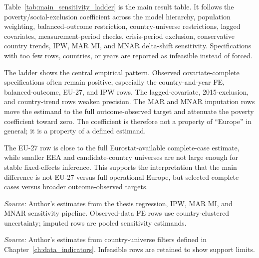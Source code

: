 Table~\ref{tab:main_sensitivity_ladder} is the main result table. It follows the poverty/social-exclusion coefficient across the model hierarchy, population weighting, balanced-outcome restriction, country-universe restrictions, lagged covariates, measurement-period checks, crisis-period exclusion, conservative country trends, IPW, MAR MI, and MNAR delta-shift sensitivity. Specifications with too few rows, countries, or years are reported as infeasible instead of forced.

The ladder shows the central empirical pattern. Observed covariate-complete specifications often remain positive, especially the country-and-year FE, balanced-outcome, EU-27, and IPW rows. The lagged-covariate, 2015-exclusion, and country-trend rows weaken precision. The MAR and MNAR imputation rows move the estimand to the full outcome-observed target and attenuate the poverty coefficient toward zero. The coefficient is therefore not a property of ``Europe'' in general; it is a property of a defined estimand.

The EU-27 row is close to the full Eurostat-available complete-case estimate, while smaller EEA and candidate-country universes are not large enough for stable fixed-effects inference. This supports the interpretation that the main difference is not EU-27 versus full operational Europe, but selected complete cases versus broader outcome-observed targets.

\begin{table}[H]
\centering
\scriptsize
\caption{Main sensitivity ladder for the poverty/social-exclusion coefficient. Rows use the generated thesis pipeline and distinguish model hierarchy, target population, universe, weighting, selection adjustment, and imputation assumptions.}
\label{tab:main_sensitivity_ladder}

\vspace{0.25em}

\begin{minipage}{0.96\textwidth}
\scriptsize \textit{Source:} Author's estimates from the thesis regression, IPW, MAR MI, and MNAR sensitivity pipeline. Observed-data FE rows use country-clustered uncertainty; imputed rows are pooled sensitivity estimands.
\end{minipage}
\end{table}

\begin{table}[H]
\centering
\small
\caption{Country-universe sensitivity for the poverty association. Rows use unweighted country-and-year fixed-effects models on available covariate-complete rows within each country universe; infeasible rows are reported rather than forced.}
\label{tab:universe_sensitivity_results}

\vspace{0.25em}

\begin{minipage}{0.92\textwidth}
\scriptsize \textit{Source:} Author's estimates from country-universe filters defined in Chapter~\ref{ch:data_indicators}. Infeasible rows are retained to show support limits.
\end{minipage}
\end{table}

